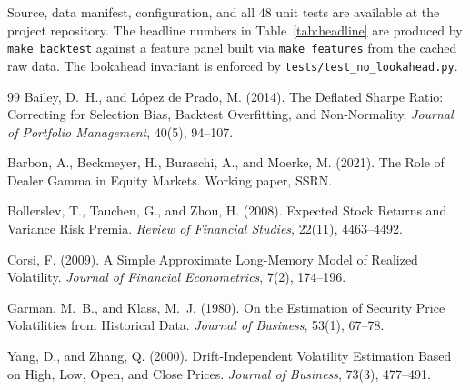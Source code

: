 \documentclass[11pt,a4paper]{article}
\begin{document}
Source, data manifest, configuration, and all 48 unit tests are available at the project repository. The headline numbers in Table~\ref{tab:headline} are produced by \verb|make backtest| against a feature panel built via \verb|make features| from the cached raw data. The lookahead invariant is enforced by \verb|tests/test_no_lookahead.py|.

\begin{thebibliography}{99}
Bailey, D.~H., and López de Prado, M. (2014). The Deflated Sharpe Ratio: Correcting for Selection Bias, Backtest Overfitting, and Non-Normality. \emph{Journal of Portfolio Management}, 40(5), 94--107.

Barbon, A., Beckmeyer, H., Buraschi, A., and Moerke, M. (2021). The Role of Dealer Gamma in Equity Markets. Working paper, SSRN.

Bollerslev, T., Tauchen, G., and Zhou, H. (2008). Expected Stock Returns and Variance Risk Premia. \emph{Review of Financial Studies}, 22(11), 4463--4492.

Corsi, F. (2009). A Simple Approximate Long-Memory Model of Realized Volatility. \emph{Journal of Financial Econometrics}, 7(2), 174--196.

Garman, M.~B., and Klass, M.~J. (1980). On the Estimation of Security Price Volatilities from Historical Data. \emph{Journal of Business}, 53(1), 67--78.

Yang, D., and Zhang, Q. (2000). Drift-Independent Volatility Estimation Based on High, Low, Open, and Close Prices. \emph{Journal of Business}, 73(3), 477--491.
\end{thebibliography}
\end{document}
